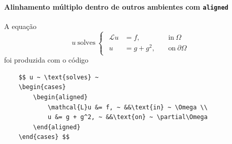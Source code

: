 \documentclass[11pt]{article}
\begin{document}
\paragraph{Alinhamento múltiplo dentro de outros ambientes com \texttt{aligned}}
A equação
$$ u ~ \text{solves} ~
\begin{cases}
    \begin{aligned}
        \mathcal{L}u &= f, ~ &&\text{in} ~ \Omega \\
        u &= g + g^2, ~ &&\text{on} ~ \partial\Omega
    \end{aligned}
\end{cases} $$
foi produzida com o código
\begin{verbatim}
    $$ u ~ \text{solves} ~
    \begin{cases}
        \begin{aligned}
            \mathcal{L}u &= f, ~ &&\text{in} ~ \Omega \\
            u &= g + g^2, ~ &&\text{on} ~ \partial\Omega
        \end{aligned}
    \end{cases} $$
\end{verbatim}
\end{document}
